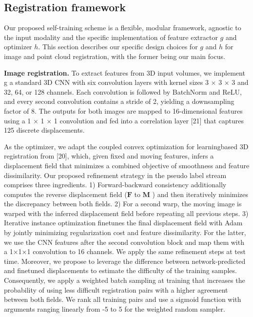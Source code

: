 \subsection{Registration framework}

Our proposed self-training scheme is a flexible, modular framework, agnostic to the input modality and the specific implementation of feature extractor $g$ and optimizer $h$. This section describes our specific design choices for $g$ and $h$ for image and point cloud registration, with the former being our main focus.


\textbf{Image registration.} To extract features from 3D input volumes, we implement g a standard 3D CNN with six convolution layers with kernel sizes 3 $\times$ 3 $\times$ 3 and 32, 64, or 128 channels. Each convolution is followed by BatchNorm and ReLU, and every second convolution contains a stride of 2, yielding a downsampling factor of 8. The outputs for both images are mapped to 16-dimensional features using a 1 $\times$ 1 $\times$ 1 convolution and fed into a correlation layer [21] that captures 125 discrete displacements.

As the optimizer, we adapt the coupled convex optimization for learningbased 3D registration from [20], which, given fixed and moving features, infers a displacement field that minimizes a combined objective of smoothness and feature dissimilarity. Our proposed refinement strategy in the pseudo label stream comprises three ingredients. 1) Forward-backward consistency additionally computes the reverse displacement field ($\boldsymbol{F}$ to $\boldsymbol{M}$ ) and then iteratively minimizes the discrepancy between both fields. 2) For a second warp, the moving image is warped with the inferred displacement field before repeating all previous steps. 3) Iterative instance optimization finetunes the final displacement field with Adam by jointly minimizing regularization cost and feature dissimilarity. For the latter, we use the CNN features after the second convolution block and map them with a 1$\times$1$\times$1 convolution to 16 channels. We apply the same refinement steps at test time. Moreover, we propose to leverage the difference between network-predicted and finetuned displacements to estimate the difficulty of the training samples. Consequently, we apply a weighted batch sampling at training that increases the probability of using less difficult registration pairs with a higher agreement between both fields. We rank all training pairs and use a sigmoid function with arguments ranging linearly from -5 to 5 for the weighted random sampler.

